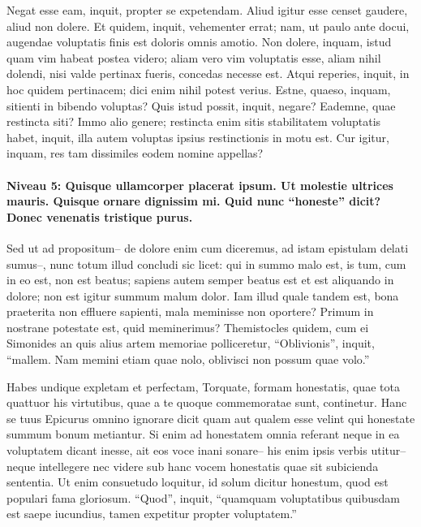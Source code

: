 \documentclass[twoside]{extreport}
\begin{document}
Negat esse eam, inquit, propter se expetendam. Aliud igitur esse censet
gaudere, aliud non dolere. Et quidem, inquit, vehementer errat; nam, ut
paulo ante docui, augendae voluptatis finis est doloris omnis amotio.
Non dolere, inquam, istud quam vim habeat postea videro; aliam vero vim
voluptatis esse, aliam nihil dolendi, nisi valde pertinax fueris,
concedas necesse est. Atqui reperies, inquit, in hoc quidem pertinacem;
dici enim nihil potest verius. Estne, quaeso, inquam, sitienti in
bibendo voluptas? Quis istud possit, inquit, negare? Eademne, quae
restincta siti? Immo alio genere; restincta enim sitis stabilitatem
voluptatis habet, inquit, illa autem voluptas ipsius restinctionis in
motu est. Cur igitur, inquam, res tam dissimiles eodem nomine appellas?

\hypertarget{niveau-5-quisque-ullamcorper-placerat-ipsum.-ut-molestie-ultrices-mauris.-quisque-ornare-dignissim-mi.-quid-nunc-honeste-dicit-donec-venenatis-tristique-purus.}{%
\paragraph{Niveau 5: Quisque ullamcorper placerat ipsum. Ut molestie
ultrices mauris. Quisque ornare dignissim mi. Quid nunc ``honeste''
dicit? Donec venenatis tristique
purus.}\label{niveau-5-quisque-ullamcorper-placerat-ipsum.-ut-molestie-ultrices-mauris.-quisque-ornare-dignissim-mi.-quid-nunc-honeste-dicit-donec-venenatis-tristique-purus.}}

Sed ut ad propositum-- de dolore enim cum diceremus, ad istam epistulam
delati sumus--, nunc totum illud concludi sic licet: qui in summo malo
est, is tum, cum in eo est, non est beatus; sapiens autem semper beatus
est et est aliquando in dolore; non est igitur summum malum dolor. Iam
illud quale tandem est, bona praeterita non effluere sapienti, mala
meminisse non oportere? Primum in nostrane potestate est, quid
meminerimus? Themistocles quidem, cum ei Simonides an quis alius artem
memoriae polliceretur, ``Oblivionis'', inquit, ``mallem. Nam memini
etiam quae nolo, oblivisci non possum quae volo.''

Habes undique expletam et perfectam, Torquate, formam honestatis, quae
tota quattuor his virtutibus, quae a te quoque commemoratae sunt,
continetur. Hanc se tuus Epicurus omnino ignorare dicit quam aut qualem
esse velint qui honestate summum bonum metiantur. Si enim ad honestatem
omnia referant neque in ea voluptatem dicant inesse, ait eos voce inani
sonare-- his enim ipsis verbis utitur-- neque intellegere nec videre sub
hanc vocem honestatis quae sit subicienda sententia. Ut enim consuetudo
loquitur, id solum dicitur honestum, quod est populari fama gloriosum.
``Quod'', inquit, ``quamquam voluptatibus quibusdam est saepe iucundius,
tamen expetitur propter voluptatem.''
\end{document}
